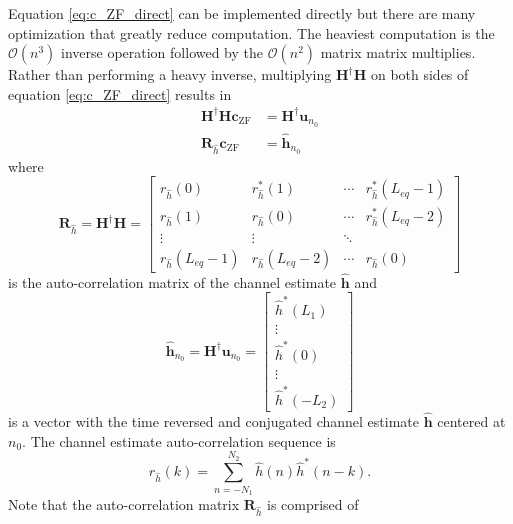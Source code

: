 Equation \eqref{eq:c_ZF_direct} can be implemented directly but there are many optimization that greatly reduce computation.
The heaviest computation is the $\mathcal{O}(n^3)$ inverse operation followed by the $\mathcal{O}(n^2)$ matrix matrix multiplies.
Rather than performing a heavy inverse, multiplying $\mathbf{H}^\dagger \mathbf{H}$ on both sides of equation \eqref{eq:c_ZF_direct} results in
\begin{align}
\mathbf{H}^\dagger\mathbf{H} \mathbf{c}_\text{ZF} &= \mathbf{H}^\dagger \mathbf{u}_{n_0} \nonumber \\
\mathbf{R}_{\hat{h}} \mathbf{c}_\text{ZF} &= \hat{\mathbf{h}}_{n_0}
\label{eq:c_ZF_solve}
\end{align}
where
\begin{equation}
\mathbf{R}_{\hat{h}} = 
\mathbf{H}^\dagger \mathbf{H} = 
		\begin{bmatrix}
		r_{\hat{h}}(0)			& r^\ast_{\hat{h}}(1)	& \cdots 	& r^\ast_{\hat{h}}(L_{eq}-1)  	\\
		r_{\hat{h}}(1) 			& r_{\hat{h}}(0)		& \cdots 	& r^\ast_{\hat{h}}(L_{eq}-2)  	\\
		\vdots	 				& \vdots				& \ddots 	&  								\\
		r_{\hat{h}}(L_{eq}-1)	& r_{\hat{h}}(L_{eq}-2)	& \cdots	& r_{\hat{h}}(0)  			
	\end{bmatrix}
	\label{eq:R_h}
\end{equation}
is the auto-correlation matrix of the channel estimate $\hat{\mathbf{h}}$
and 
\begin{equation}
\hat{\mathbf{h}}_{n_0} = \mathbf{H}^\dagger \mathbf{u}_{n_0} = 
\begin{bmatrix} \hat{h}^\ast(L_1) \\ \vdots \\ \hat{h}^\ast(0) \\ \vdots \\ \hat{h}^\ast(-L_2)  \end{bmatrix}
\label{eq:h_no}
\end{equation}
is a vector with the time reversed and conjugated channel estimate $\hat{\mathbf{h}}$ centered at $n_0$.
The channel estimate auto-correlation sequence is
\begin{equation}
r_{\hat{h}}(k) = \sum_{n=-N_1}^{N_2} \hat{h}(n) \hat{h}^\ast(n-k).
\label{eq:sample_autocorrelation}
\end{equation}
Note that the auto-correlation matrix $\mathbf{R}_{\hat{h}}$ is comprised of 
